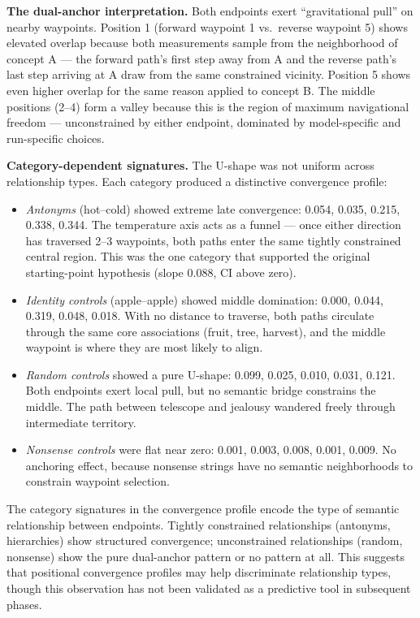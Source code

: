 \textbf{The dual-anchor interpretation.} Both endpoints exert ``gravitational pull'' on nearby waypoints. Position 1 (forward waypoint 1 vs.~reverse waypoint 5) shows elevated overlap because both measurements sample from the neighborhood of concept A --- the forward path's first step away from A and the reverse path's last step arriving at A draw from the same constrained vicinity. Position 5 shows even higher overlap for the same reason applied to concept B. The middle positions (2--4) form a valley because this is the region of maximum navigational freedom --- unconstrained by either endpoint, dominated by model-specific and run-specific choices.

\textbf{Category-dependent signatures.} The U-shape was not uniform across relationship types. Each category produced a distinctive convergence profile:

\begin{itemize}
\item
  \emph{Antonyms} (hot--cold) showed extreme late convergence: 0.054, 0.035, 0.215, 0.338, 0.344. The temperature axis acts as a funnel --- once either direction has traversed 2--3 waypoints, both paths enter the same tightly constrained central region. This was the one category that supported the original starting-point hypothesis (slope 0.088, CI above zero).
\item
  \emph{Identity controls} (apple--apple) showed middle domination: 0.000, 0.044, 0.319, 0.048, 0.018. With no distance to traverse, both paths circulate through the same core associations (fruit, tree, harvest), and the middle waypoint is where they are most likely to align.
\item
  \emph{Random controls} showed a pure U-shape: 0.099, 0.025, 0.010, 0.031, 0.121. Both endpoints exert local pull, but no semantic bridge constrains the middle. The path between telescope and jealousy wandered freely through intermediate territory.
\item
  \emph{Nonsense controls} were flat near zero: 0.001, 0.003, 0.008, 0.001, 0.009. No anchoring effect, because nonsense strings have no semantic neighborhoods to constrain waypoint selection.
\end{itemize}

The category signatures in the convergence profile encode the type of semantic relationship between endpoints. Tightly constrained relationships (antonyms, hierarchies) show structured convergence; unconstrained relationships (random, nonsense) show the pure dual-anchor pattern or no pattern at all. This suggests that positional convergence profiles may help discriminate relationship types, though this observation has not been validated as a predictive tool in subsequent phases.

